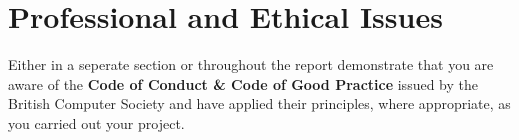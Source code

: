 \chapter{Professional and Ethical Issues}
Either in a seperate section or throughout the report demonstrate that you are aware of the \textbf{Code of Conduct \& Code of Good Practice} issued by the British Computer Society and have applied their principles, where appropriate, as you carried out your project.

